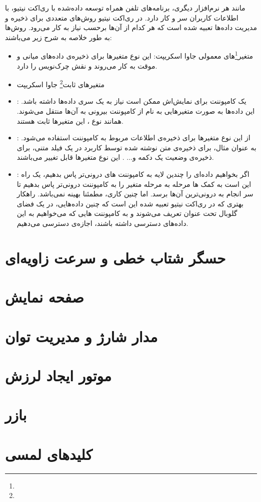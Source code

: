 مانند هر نرم‌افزار دیگری، برنامه‌های تلفن همراه توسعه داده‌شده با ری‌اکت نیتیو، با اطلاعات کاربران سر و کار دارد. در ری‌اکت نیتیو روش‌های متعددی برای ذخیره و مدیریت داده‌ها تعبیه شده است که هر کدام از آن‌ها برحسب نیاز به کار می‌رود. روش‌ها به طور خلاصه به شرح زیر می‌باشند\cite{wiki:react}:
\begin{itemize}
	\item متغیر\footnote{}های معمولی جاوا اسکریپت: این نوع متغیرها برای ذخیره‌ی داده‌های میانی و موقت به کار می‌روند و نقش چرک‌نویس را دارد.
	\item متغیرهای ثابت\footnote{} جاوا اسکریپت
	\item {}: یک کامپوننت برای نمایش‌اش ممکن است نیاز به یک سری داده‌ها داشته باشد. این داده‌ها به صورت متغیرهایی به نام  از کامپوننت بیرونی به آن‌ها منتقل می‌شوند. همانند نوع ، این متغیرها ثابت هستند.
	\item {}: از این نوع متغیرها برای ذخیره‌ی اطلاعات مربوط به کامپوننت استفاده می‌شود. به عنوان مثال، برای ذخیره‌ی متن نوشته شده توسط کاربرد در یک فیلد متنی، برای ذخیره‌ی وضعیت یک دکمه و... . این نوع متغیرها قابل تغییر می‌باشند.
	\item {}: اگر بخواهیم داده‌ای را چندین لایه به کامپوننت های درونی‌تر پاس بدهیم، یک راه این است به کمک ها مرحله به مرحله متغیر را به کامپوننت درونی‌تر پاس بدهیم تا سر انجام به درونی‌ترین آن‌ها برسد. اما چنین کاری، مطمئنا بهینه نمی‌باشد. راهکار بهتری که در ری‌اکت نیتیو تعبیه شده این است که چنین داده‌هایی، در یک فضای گلوبال تحت عنوان  تعریف می‌شوند و به کامپوننت هایی که می‌خواهیم به این داده‌های دسترسی داشته باشند، اجازه‌ی دسترسی می‌دهیم.\newline
\end{itemize}

\section{حسگر شتاب خطی و سرعت زاویه‌ای}

\section{صفحه نمایش}

\section{مدار شارژ و مدیریت توان}

\section{موتور ایجاد لرزش}

\section{بازر}

\section{کلیدهای لمسی}